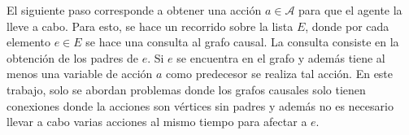 El siguiente paso corresponde a obtener una acción $a \in \mathcal{A}$ para que el agente la lleve a cabo.
Para esto, se hace un recorrido sobre la lista $E$, donde
por cada elemento $e \in E$ se hace una consulta al grafo causal. La consulta consiste en la
obtención de los padres de $e$.  Si $e$ se encuentra en el grafo y además tiene al menos una variable de acción $a$ como predecesor se realiza tal acción.
En este trabajo, solo se abordan problemas donde los grafos causales solo tienen conexiones donde la acciones son vértices sin padres y además no es necesario llevar a cabo varias acciones al mismo tiempo para afectar a $e$.




